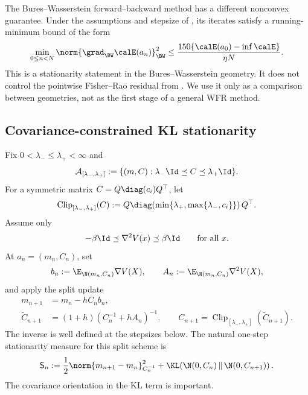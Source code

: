 The Bures--Wasserstein forward--backward method has a different nonconvex
guarantee.  Under the assumptions and stepsize of
\citet[Theorem~5.5]{diao2023forward}, its iterates satisfy a running-minimum
bound of the form
\begin{equation}
  \min_{0\leq n<N}
  \norm{\grad_{\BW}\calE(a_n)}_{\BW}^2
  \leq
  \frac{150\{\calE(a_0)-\inf\calE\}}{\eta N}.
  \label{eq:nonconvex-bw-running-min}
\end{equation}
This is a stationarity statement in the Bures--Wasserstein geometry.  It does
not control the pointwise Fisher--Rao residual from
.
We use it only as a comparison between geometries, not as the first stage of a
general WFR method.

\subsection{Covariance-constrained KL stationarity}
\label{sec:nonconvex-clipped}

Fix \(0<\lambda_-\leq\lambda_+<\infty\) and
\[
  \mathcal A_{[\lambda_-,\lambda_+]}
  :=
  \{(m,C):\lambda_-\Id\preceq C\preceq\lambda_+\Id\}.
\]
For a symmetric matrix \(C=Q\diag(c_i)Q^\top\), let
\[
  \operatorname{Clip}_{[\lambda_-,\lambda_+]}(C)
  :=
  Q\diag\!\left(
    \min\{\lambda_+,\max\{\lambda_-,c_i\}\}
  \right)Q^\top.
\]
Assume only
\begin{equation}
  -\beta\Id\preceq\nabla^2V(x)\preceq\beta\Id
  \qquad\text{for all }x.
  \label{eq:nonconvex-smoothness}
\end{equation}
At \(a_n=(m_n,C_n)\), set
\[
  b_n:=\E_{\N(m_n,C_n)}\nabla V(X),
  \qquad
  A_n:=\E_{\N(m_n,C_n)}\nabla^2V(X),
\]
and apply the split update
\begin{align}
  m_{n+1}
  &=m_n-hC_nb_n,
  \label{eq:nonconvex-clipped-mean}\\
  \widetilde C_{n+1}
  &=(1+h)(C_n^{-1}+hA_n)^{-1},
  \qquad
  C_{n+1}
  =\operatorname{Clip}_{[\lambda_-,\lambda_+]}
    (\widetilde C_{n+1}).
  \label{eq:nonconvex-clipped-covariance}
\end{align}
The inverse is well defined at the stepsizes below.  The natural one-step
stationarity measure for this split scheme is
\begin{equation}
  \mathsf S_n
  :=
  \frac12\norm{m_{n+1}-m_n}_{C_n^{-1}}^2
  +
  \KL\!\left(
    \N(0,C_n)\,\middle\|\,\N(0,C_{n+1})
  \right).
  \label{eq:nonconvex-split-stationarity}
\end{equation}
The covariance orientation in the KL term is important.

